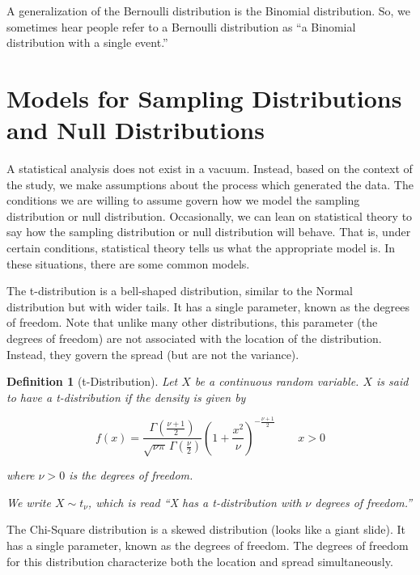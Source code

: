 \documentclass[
]{book}
\theoremstyle{plain}
\theoremstyle{mydefn}
\newtheorem{definition}{Definition}[chapter]
\theoremstyle{myexmpl}
\theoremstyle{remark}
\begin{document}
\begin{rmdtip}
A generalization of the Bernoulli distribution is the Binomial distribution. So, we sometimes hear people refer to a Bernoulli distribution as ``a Binomial distribution with a single event.''
\end{rmdtip}

\hypertarget{models-for-sampling-distributions-and-null-distributions}{%
\section{Models for Sampling Distributions and Null Distributions}\label{models-for-sampling-distributions-and-null-distributions}}

A statistical analysis does not exist in a vacuum. Instead, based on the context of the study, we make assumptions about the process which generated the data. The conditions we are willing to assume govern how we model the sampling distribution or null distribution. Occasionally, we can lean on statistical theory to say how the sampling distribution or null distribution will behave. That is, under certain conditions, statistical theory tells us what the appropriate model is. In these situations, there are some common models.

The t-distribution is a bell-shaped distribution, similar to the Normal distribution but with wider tails. It has a single parameter, known as the degrees of freedom. Note that unlike many other distributions, this parameter (the degrees of freedom) are not associated with the location of the distribution. Instead, they govern the spread (but are not the variance).

\begin{definition}[t-Distribution]
Let \(X\) be a continuous random variable. \(X\) is said to have a t-distribution if the density is given by

\[f(x) = \frac{\Gamma \left(\frac{\nu+1}{2} \right)} {\sqrt{\nu\pi}\,\Gamma \left(\frac{\nu}{2} \right)} \left(1+\frac{x^2}{\nu} \right)^{-\frac{\nu+1}{2}} \qquad x > 0\]

where \(\nu > 0\) is the degrees of freedom.

We write \(X \sim t_{\nu}\), which is read ``X has a t-distribution with \(\nu\) degrees of freedom.''
\end{definition}

The Chi-Square distribution is a skewed distribution (looks like a giant slide). It has a single parameter, known as the degrees of freedom. The degrees of freedom for this distribution characterize both the location and spread simultaneously.
\end{document}
